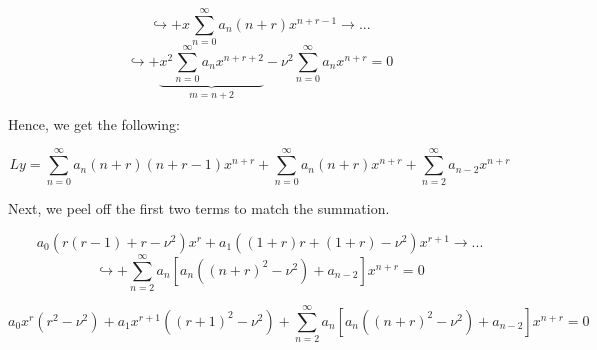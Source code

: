 \documentclass{article}
\begin{document}
$$ \hookrightarrow + x\sum_{n =0}^{\infty} a_n (n+r)x^{n+r-1} \rightarrow ...$$
$$ \hookrightarrow + \underbrace{x^2\sum_{n = 0}^\infty a_n x^{n+r+2}}_{m = n+2} - \nu^2\sum_{n = 0}^\infty a_n x^{n+r} = 0$$

Hence, we get the following:

$$Ly = \sum_{n = 0}^\infty a_n (n+r)(n+r-1) x^{n+r} + \sum_{n=0}^\infty a_n (n+r) x^{n+r} + \sum_{n = 2}^\infty a_{n-2} x^{n+r}$$

Next, we peel off the first two terms to match the summation. 

$$a_0 (r(r-1) + r - \nu^2) x^r + a_1 ((1+r) r + (1+r) - \nu^2) x^{r+1} \rightarrow ... $$
$$ \hookrightarrow + \sum_{n = 2}^\infty a_n \left[ a_n \left( (n+r)^2 - \nu^2 \right) + a_{n-2} \right] x^{n+r} = 0$$

$$a_0 x^r (r^2 - \nu^2) + a_1 x^{r+1} \left((r+1)^2 - \nu^2 \right)  + \sum_{n = 2}^\infty a_n \left[ a_n \left( (n+r)^2 - \nu^2 \right) + a_{n-2} \right] x^{n+r} = 0$$
\end{document}
